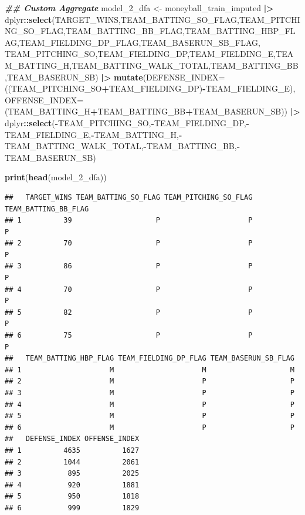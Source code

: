 \documentclass[
]{article}
\newenvironment{Shaded}{\begin{snugshade}}{\end{snugshade}}
\newcommand{\AttributeTok}[1]{\textcolor[rgb]{0.13,0.29,0.53}{#1}}
\newcommand{\DocumentationTok}[1]{\textcolor[rgb]{0.56,0.35,0.01}{\textbf{\textit{#1}}}}
\newcommand{\FunctionTok}[1]{\textcolor[rgb]{0.13,0.29,0.53}{\textbf{#1}}}
\newcommand{\NormalTok}[1]{#1}
\newcommand{\OtherTok}[1]{\textcolor[rgb]{0.56,0.35,0.01}{#1}}
\newcommand{\SpecialCharTok}[1]{\textcolor[rgb]{0.81,0.36,0.00}{\textbf{#1}}}
\begin{document}
\begin{Shaded}
\begin{Highlighting}[]
\DocumentationTok{\#\# Custom Aggregate}
\NormalTok{model\_2\_dfa }\OtherTok{\textless{}{-}}\NormalTok{ moneyball\_train\_imputed }\SpecialCharTok{|\textgreater{}} 
\NormalTok{  dplyr}\SpecialCharTok{::}\FunctionTok{select}\NormalTok{(TARGET\_WINS,TEAM\_BATTING\_SO\_FLAG,TEAM\_PITCHING\_SO\_FLAG,TEAM\_BATTING\_BB\_FLAG,TEAM\_BATTING\_HBP\_FLAG,TEAM\_FIELDING\_DP\_FLAG,TEAM\_BASERUN\_SB\_FLAG,}
\NormalTok{         TEAM\_PITCHING\_SO,TEAM\_FIELDING\_DP,TEAM\_FIELDING\_E,TEAM\_BATTING\_H,TEAM\_BATTING\_WALK\_TOTAL,TEAM\_BATTING\_BB,TEAM\_BASERUN\_SB) }\SpecialCharTok{|\textgreater{}}
  \FunctionTok{mutate}\NormalTok{(}\AttributeTok{DEFENSE\_INDEX=}\NormalTok{((TEAM\_PITCHING\_SO}\SpecialCharTok{+}\NormalTok{TEAM\_FIELDING\_DP)}\SpecialCharTok{{-}}\NormalTok{TEAM\_FIELDING\_E),}
         \AttributeTok{OFFENSE\_INDEX=}\NormalTok{(TEAM\_BATTING\_H}\SpecialCharTok{+}\NormalTok{TEAM\_BATTING\_BB}\SpecialCharTok{+}\NormalTok{TEAM\_BASERUN\_SB)) }\SpecialCharTok{|\textgreater{}}
\NormalTok{  dplyr}\SpecialCharTok{::}\FunctionTok{select}\NormalTok{(}\SpecialCharTok{{-}}\NormalTok{TEAM\_PITCHING\_SO,}\SpecialCharTok{{-}}\NormalTok{TEAM\_FIELDING\_DP,}\SpecialCharTok{{-}}\NormalTok{TEAM\_FIELDING\_E,}\SpecialCharTok{{-}}\NormalTok{TEAM\_BATTING\_H,}\SpecialCharTok{{-}}\NormalTok{TEAM\_BATTING\_WALK\_TOTAL,}\SpecialCharTok{{-}}\NormalTok{TEAM\_BATTING\_BB,}\SpecialCharTok{{-}}\NormalTok{TEAM\_BASERUN\_SB)}

\FunctionTok{print}\NormalTok{(}\FunctionTok{head}\NormalTok{(model\_2\_dfa))}
\end{Highlighting}
\end{Shaded}

\begin{verbatim}
##   TARGET_WINS TEAM_BATTING_SO_FLAG TEAM_PITCHING_SO_FLAG TEAM_BATTING_BB_FLAG
## 1          39                    P                     P                    P
## 2          70                    P                     P                    P
## 3          86                    P                     P                    P
## 4          70                    P                     P                    P
## 5          82                    P                     P                    P
## 6          75                    P                     P                    P
##   TEAM_BATTING_HBP_FLAG TEAM_FIELDING_DP_FLAG TEAM_BASERUN_SB_FLAG
## 1                     M                     M                    M
## 2                     M                     P                    P
## 3                     M                     P                    P
## 4                     M                     P                    P
## 5                     M                     P                    P
## 6                     M                     P                    P
##   DEFENSE_INDEX OFFENSE_INDEX
## 1          4635          1627
## 2          1044          2061
## 3           895          2025
## 4           920          1881
## 5           950          1818
## 6           999          1829
\end{verbatim}
\end{document}
